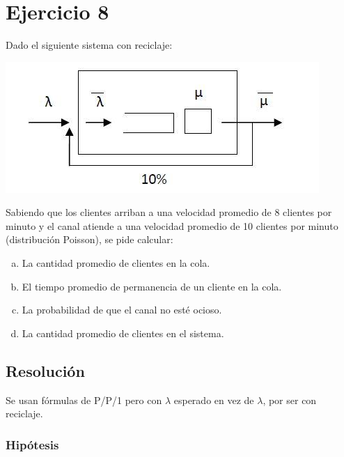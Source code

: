 \documentclass[a4paper,11pt]{article}
\begin{document}
\vspace{35pt}
\leftskip=0pt
\parindent=0pt
\section{\textbf{Ejercicio 8}}

\vspace{13pt}
Dado el siguiente sistema con reciclaje:

\includegraphics[width=338pt, height=141pt, keepaspectratio=true]{TP1-Colas-fig007.png}

\vspace{27pt}
Sabiendo que los clientes arriban a una velocidad promedio de 8 clientes por
minuto y el canal atiende a una velocidad promedio de 10 clientes por minuto
(distribución Poisson), se pide calcular:
\begin{enumerate}[a)]
  \item La cantidad promedio de clientes en la cola.
  \item El tiempo promedio de permanencia de un cliente en la cola.
  \item La probabilidad de que el canal no esté ocioso.
  \item La cantidad promedio de clientes en el sistema.
\end{enumerate}

\vspace{13pt}
\leftskip=0pt
\parindent=0pt
\subsection{\textbf{Resolución}}

Se usan fórmulas de P/P/1 pero con $\lambda$ esperado 
en vez de $\lambda$, por ser con reciclaje.

\vspace{21pt}
\subsubsection*{Hipótesis}
\end{document}
